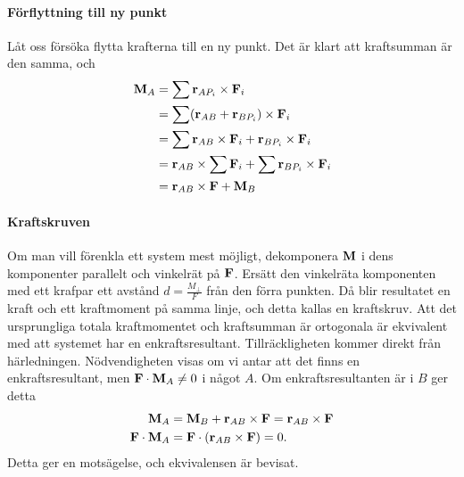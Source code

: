 \paragraph{Förflyttning till ny punkt}
Låt oss försöka flytta krafterna till en ny punkt. Det är klart att kraftsumman är den samma, och
\begin{align*}
	\vect{M}_A &= \sum\vect{r}_{AP_i}\times\vect{F}_i \\
	           &= \sum(\vect{r}_{AB} + \vect{r}_{BP_i})\times\vect{F}_i \\
	           &= \sum\vect{r}_{AB}\times\vect{F}_i + \vect{r}_{BP_i}\times\vect{F}_i \\
	           &= \vect{r}_{AB}\times\sum\vect{F}_i + \sum\vect{r}_{BP_i}\times\vect{F}_i \\
	           &= \vect{r}_{AB}\times\vect{F} + \vect{M}_{B}
\end{align*}

\paragraph{Kraftskruven}
Om man vill förenkla ett system mest möjligt, dekomponera $\vect{M}$ i dens komponenter parallelt och vinkelrät på $\vect{F}$. Ersätt den vinkelräta komponenten med ett krafpar ett avstånd $d = \frac{M_\perp}{F}$ från den förra punkten. Då blir resultatet en kraft och ett kraftmoment på samma linje, och detta kallas en kraftskruv. Att det ursprungliga totala kraftmomentet och kraftsumman är ortogonala är ekvivalent med att systemet har en enkraftsresultant. Tillräckligheten kommer direkt från härledningen. Nödvendigheten visas om vi antar att det finns en enkraftsresultant, men $\vect{F}\cdot\vect{M}_A\neq 0$ i något $A$. Om enkraftsresultanten är i $B$ ger detta
\begin{align*}
	\vect{M}_A              &= \vect{M}_B + \vect{r}_{AB}\times\vect{F} = \vect{r}_{AB}\times\vect{F} \\
	\vect{F}\cdot\vect{M}_A &= \vect{F}\cdot(\vect{r}_{AB}\times\vect{F}) = 0.
\end{align*}
Detta ger en motsägelse, och ekvivalensen är bevisat.